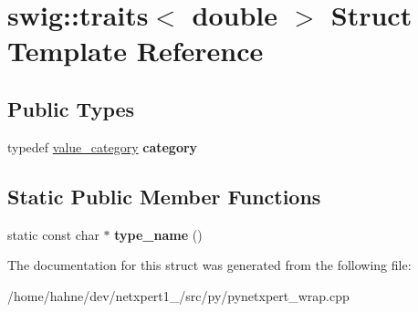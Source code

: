 \hypertarget{structswig_1_1traits_3_01double_01_4}{}\section{swig\+:\+:traits$<$ double $>$ Struct Template Reference}
\label{structswig_1_1traits_3_01double_01_4}
\subsection*{Public Types}
\begin{DoxyCompactItemize}
\item 
typedef \hyperlink{structswig_1_1value__category}{value\+\_\+category} {\bfseries category}\hypertarget{structswig_1_1traits_3_01double_01_4_a003467ac91b8ca5a649cdf68f82ab7de}{}\label{structswig_1_1traits_3_01double_01_4_a003467ac91b8ca5a649cdf68f82ab7de}

\end{DoxyCompactItemize}
\subsection*{Static Public Member Functions}
\begin{DoxyCompactItemize}
\item 
static const char $\ast$ {\bfseries type\+\_\+name} ()\hypertarget{structswig_1_1traits_3_01double_01_4_a2474db5e0109bff332ac101c976a8b22}{}\label{structswig_1_1traits_3_01double_01_4_a2474db5e0109bff332ac101c976a8b22}

\end{DoxyCompactItemize}


The documentation for this struct was generated from the following file\+:\begin{DoxyCompactItemize}
\item 
/home/hahne/dev/netxpert1\+\_/src/py/pynetxpert\+\_\+wrap.\+cpp\end{DoxyCompactItemize}

